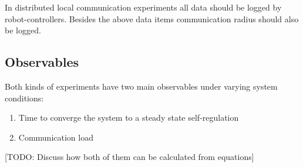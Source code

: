 \documentclass{article}
\begin{document}
In distributed local communication experiments all data should be logged by  robot-controllers. Besides the above data items communication radius should also be logged.

\subsection{Observables}
Both kinds of experiments have two main observables under varying system conditions:
\begin{enumerate}
\item Time to converge the system to a steady state self-regulation
\item Communication load 
\end{enumerate}
[TODO: Discuss how both of them can be calculated from equations]
\end{document}
